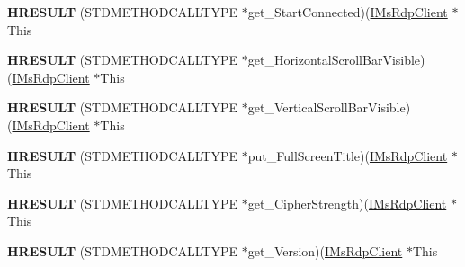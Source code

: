 \begin{DoxyCompactItemize}
\item 
\mbox{\label{struct_m_s_t_s_c_lib_1_1_i_ms_rdp_client_vtbl_a76d7d0c282b8770a9fdbbd36b3d475a9}} 
{\bfseries H\+R\+E\+S\+U\+LT} (S\+T\+D\+M\+E\+T\+H\+O\+D\+C\+A\+L\+L\+T\+Y\+PE $\ast$get\+\_\+\+Start\+Connected)(\hyperlink{interface_m_s_t_s_c_lib_1_1_i_ms_rdp_client}{I\+Ms\+Rdp\+Client} $\ast$This
\item 
\mbox{\label{struct_m_s_t_s_c_lib_1_1_i_ms_rdp_client_vtbl_a76ab70df18c5beb08db2f5aa6011a8fb}} 
{\bfseries H\+R\+E\+S\+U\+LT} (S\+T\+D\+M\+E\+T\+H\+O\+D\+C\+A\+L\+L\+T\+Y\+PE $\ast$get\+\_\+\+Horizontal\+Scroll\+Bar\+Visible)(\hyperlink{interface_m_s_t_s_c_lib_1_1_i_ms_rdp_client}{I\+Ms\+Rdp\+Client} $\ast$This
\item 
\mbox{\label{struct_m_s_t_s_c_lib_1_1_i_ms_rdp_client_vtbl_aa176e1b8935e1391bc55c2391eb05929}} 
{\bfseries H\+R\+E\+S\+U\+LT} (S\+T\+D\+M\+E\+T\+H\+O\+D\+C\+A\+L\+L\+T\+Y\+PE $\ast$get\+\_\+\+Vertical\+Scroll\+Bar\+Visible)(\hyperlink{interface_m_s_t_s_c_lib_1_1_i_ms_rdp_client}{I\+Ms\+Rdp\+Client} $\ast$This
\item 
\mbox{\label{struct_m_s_t_s_c_lib_1_1_i_ms_rdp_client_vtbl_a7d1c9e0c14ad33f540213d3e3b34e636}} 
{\bfseries H\+R\+E\+S\+U\+LT} (S\+T\+D\+M\+E\+T\+H\+O\+D\+C\+A\+L\+L\+T\+Y\+PE $\ast$put\+\_\+\+Full\+Screen\+Title)(\hyperlink{interface_m_s_t_s_c_lib_1_1_i_ms_rdp_client}{I\+Ms\+Rdp\+Client} $\ast$This
\item 
\mbox{\label{struct_m_s_t_s_c_lib_1_1_i_ms_rdp_client_vtbl_af25538ea6e4637e0ac83d7bbeee5a6ef}} 
{\bfseries H\+R\+E\+S\+U\+LT} (S\+T\+D\+M\+E\+T\+H\+O\+D\+C\+A\+L\+L\+T\+Y\+PE $\ast$get\+\_\+\+Cipher\+Strength)(\hyperlink{interface_m_s_t_s_c_lib_1_1_i_ms_rdp_client}{I\+Ms\+Rdp\+Client} $\ast$This
\item 
\mbox{\label{struct_m_s_t_s_c_lib_1_1_i_ms_rdp_client_vtbl_af6b7b38ae86c093732b7d907b5758161}} 
{\bfseries H\+R\+E\+S\+U\+LT} (S\+T\+D\+M\+E\+T\+H\+O\+D\+C\+A\+L\+L\+T\+Y\+PE $\ast$get\+\_\+\+Version)(\hyperlink{interface_m_s_t_s_c_lib_1_1_i_ms_rdp_client}{I\+Ms\+Rdp\+Client} $\ast$This

\end{DoxyCompactItemize}
